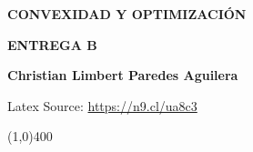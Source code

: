 \begin{center}
\textbf{CONVEXIDAD Y OPTIMIZACIÓN}

\textbf{\Large ENTREGA B}

\textbf{ \textbf{Christian Limbert Paredes Aguilera}}
\end{center}
\begin{center}
    Latex Source: \url{https://n9.cl/ua8c3}
\end{center}

\line(1,0){400}

\begin{enumerate}

\setcounter{enumi}{2}

\begin{comment}
    \item \textbf{\boldmath Se considera el problemas
    $$
    \begin{array}{ll}
	\text{minimiza} & x^2+1\\
	\text{sujeto a} & (x-2)(x-4)\leq 0,
    \end{array}
    $$
    con $x\in \mathbb{R}$.}
    \begin{enumerate}[\bfseries (a)]

	\item \textbf{\boldmath Describe el conjunto accesible, el valor óptimo y las solución optima.}\\
	

	    \textbf{solución:} El conjunto accesible, esta formado por todos los valores de $x$ que satisfacen
	    $$ (x-2)(x-4)\leq 0.$$
	    Esto significa que $x$ deber estar en el intervalo $[2,4]$. Ya que, si $x<2$ o $x>4$, entonces $(x-2)(x-4)>0$.\\
	    
	    Para calcular el valor óptimo del problema de optimización dado, necesitamos encontrar el valor mínimo de la función objetivo $x^2+1$ sujeto a la restricción $(x-2)(x-4)\leq 0$.\\

	    La función objetivo $x^2+1$ es una función cuadrática que es siempre creciente en el intervalo $[2,4]$. Por lo tanto, el valor mínimo de la función objetivo en este intervalo se alcanza en el extremo inferior del intervalo. Es decir, la solución optima es 
	    $$x=2.$$

	    Sustituyendo $x=2$ en la función objetivo obtenemos el valor óptimo:
	    $$x^2+1 = 2^2+1 = 5.$$


\end{comment}
\end{enumerate}
